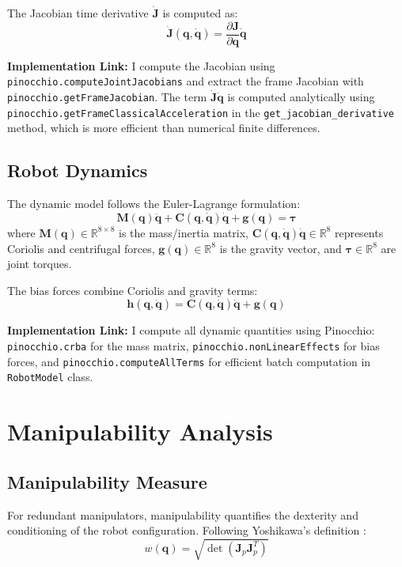 \documentclass[journal,10pt,twocolumn]{IEEEtran}
\begin{document}
The Jacobian time derivative $\dot{\mathbf{J}}$ is computed as:
\begin{equation}
\dot{\mathbf{J}}(\mathbf{q}, \dot{\mathbf{q}}) = \frac{\partial \mathbf{J}}{\partial \mathbf{q}}\dot{\mathbf{q}}
\end{equation}

\textbf{Implementation Link:} I compute the Jacobian using \texttt{pinocchio.computeJointJacobians} and extract the frame Jacobian with \texttt{pinocchio.getFrameJacobian}. The term $\dot{\mathbf{J}}\dot{\mathbf{q}}$ is computed analytically using \texttt{pinocchio.getFrameClassicalAcceleration} in the \texttt{get\_jacobian\_derivative} method, which is more efficient than numerical finite differences.

\subsection{Robot Dynamics}
The dynamic model follows the Euler-Lagrange formulation:
\begin{equation}
\mathbf{M}(\mathbf{q})\ddot{\mathbf{q}} + \mathbf{C}(\mathbf{q}, \dot{\mathbf{q}})\dot{\mathbf{q}} + \mathbf{g}(\mathbf{q}) = \boldsymbol{\tau}
\end{equation}
where $\mathbf{M}(\mathbf{q}) \in \mathbb{R}^{8 \times 8}$ is the mass/inertia matrix, $\mathbf{C}(\mathbf{q}, \dot{\mathbf{q}})\dot{\mathbf{q}} \in \mathbb{R}^8$ represents Coriolis and centrifugal forces, $\mathbf{g}(\mathbf{q}) \in \mathbb{R}^8$ is the gravity vector, and $\boldsymbol{\tau} \in \mathbb{R}^8$ are joint torques.

The bias forces combine Coriolis and gravity terms:
\begin{equation}
\mathbf{h}(\mathbf{q}, \dot{\mathbf{q}}) = \mathbf{C}(\mathbf{q}, \dot{\mathbf{q}})\dot{\mathbf{q}} + \mathbf{g}(\mathbf{q})
\end{equation}

\textbf{Implementation Link:} I compute all dynamic quantities using Pinocchio: \texttt{pinocchio.crba} for the mass matrix, \texttt{pinocchio.nonLinearEffects} for bias forces, and \texttt{pinocchio.computeAllTerms} for efficient batch computation in \texttt{RobotModel} class.

\section{Manipulability Analysis}

\subsection{Manipulability Measure}
For redundant manipulators, manipulability quantifies the dexterity and conditioning of the robot configuration. Following Yoshikawa's definition \cite{yoshikawa1985}:
\begin{equation}
w(\mathbf{q}) = \sqrt{\det(\mathbf{J}_p\mathbf{J}_p^T)}
\end{equation}
\end{document}
